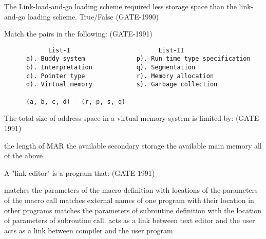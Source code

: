 
\begin{questyle}

  \question  The Link-load-and-go loading scheme required less storage space than the link-and-go loading scheme. True/False (GATE-1990)

\end{questyle}


\begin{questyle}

  \question Match the pairs in the following: (GATE-1991)

  \begin{lstlisting}
            List-I                        List-II
      a). Buddy system              p). Run time type specification
      b). Interpretation            q). Segmentation
      c). Pointer type              r). Memory allocation
      d). Virtual memory            s). Garbage collection

      (a, b, c, d) - (r, p, s, q)

  \end{lstlisting}

\end{questyle}


\begin{questyle}

  \question  The total size of address space in a virtual memory system is limited by: (GATE-1991)

  \begin{choices}
    \choice the length of MAR
    \choice the available secondary storage
    \choice the available main memory
    \choice all of the above
  \end{choices}

\end{questyle}


\begin{questyle}

  \question  A "link editor" is a program that: (GATE-1991)

  \begin{choices}
    \choice matches the parameters of the macro-definition with locations of the parameters of the macro call
    \correctchoice matches external names of one program with their location in other programs
    \choice matches the parameters of subroutine definition with the location of parameters of subroutine call.
    \choice acts as a link between text editor and the user
    \choice acts as a link between compiler and the user program
  \end{choices}

\end{questyle}


